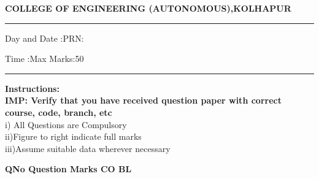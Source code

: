 \documentclass[12pt]{article}
\begin{document}
	\par
	{\bf{COLLEGE OF ENGINEERING (AUTONOMOUS),KOLHAPUR}}
	\par\noindent\rule{\textwidth}{0.4pt}
	
	\par
	\par
	\par
\begin{flushleft}
	Day and Date :{}\hspace{5.5cm}PRN:
\end{flushleft}

\begin{flushleft}
	Time :{}\hspace{7cm}Max Marks:{50}\\
\end{flushleft}
\noindent\rule{\textwidth}{0.1pt}
\begin{flushleft}
	{\bf Instructions:}\\
	{\hspace{0.5cm} \bf IMP: Verify that you have received question paper with correct course, code, branch, etc}\\
	\hspace{1cm}i) All Questions are Compulsory\\
	\hspace{1cm}ii)Figure to right indicate full marks\\
	\hspace{1cm}iii)Assume suitable data wherever necessary\\
\end{flushleft} 

	\begin{flushleft}
	\bf{QNo}\hspace{1.2cm} \bf{Question} \hspace{5.5cm}  \bf{Marks} \hspace{0.2cm} \bf{CO} \hspace{0.2cm}	\bf{BL}	
	
	
	
	
	
	
\end{flushleft}

		

	
	
\end{document}

